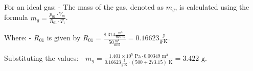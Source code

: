 For an ideal gas:
- The mass of the gas, denoted as \( m_g \), is calculated using the formula \( m_g = \frac{p_{01} \cdot V_m}{R_{01} \cdot T_1} \).

Where:
- \( R_{01} \) is given by \( R_{01} = \frac{8.314 \frac{\text{m}^3}{\text{mol} \cdot \text{K}}}{50 \frac{\text{m}^2}{\text{mol}}} = 0.16623 \frac{\text{J}}{\text{g} \cdot \text{K}} \).

Substituting the values:
- \( m_g = \frac{1.401 \times 10^5 \text{ Pa} \cdot 0.00349 \text{ m}^3}{0.16623 \frac{\text{J}}{\text{g} \cdot \text{K}} \cdot (500 + 273.15) \text{ K}} = 3.422 \text{ g} \).